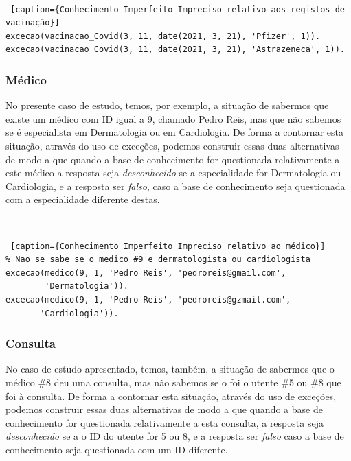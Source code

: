 \documentclass[a4paper, 11pt]{article}
\begin{document}
\

\begin{lstlisting} [caption={Conhecimento Imperfeito Impreciso relativo aos registos de 
vacinação}]
excecao(vacinacao_Covid(3, 11, date(2021, 3, 21), 'Pfizer', 1)).
excecao(vacinacao_Covid(3, 11, date(2021, 3, 21), 'Astrazeneca', 1)).
\end{lstlisting}

\subsubsection*{Médico}

No presente caso de estudo, temos, por exemplo, a situação de sabermos que existe
um médico com ID igual a 9, chamado Pedro Reis, mas que não sabemos se é especialista em
Dermatologia ou em Cardiologia. De forma a contornar esta situação, através do uso de
exceções, podemos construir essas duas alternativas de modo a que quando a base de
conhecimento for questionada relativamente a este médico a resposta seja \textit{desconhecido} se a
especialidade for Dermatologia ou Cardiologia, e a resposta ser \textit{falso}, caso a
base de conhecimento seja questionada com a especialidade diferente destas.

\

\begin{lstlisting} [caption={Conhecimento Imperfeito Impreciso relativo ao médico}]
% Nao se sabe se o medico #9 e dermatologista ou cardiologista
excecao(medico(9, 1, 'Pedro Reis', 'pedroreis@gmail.com',
        'Dermatologia')).
excecao(medico(9, 1, 'Pedro Reis', 'pedroreis@gzmail.com',
       'Cardiologia')).
\end{lstlisting}

\subsubsection*{Consulta}

No caso de estudo apresentado, temos, também, a situação de sabermos que o médico \#8 deu uma 
consulta, mas não sabemos se o foi o utente \#5 ou \#8 que foi à consulta. De forma a contornar 
esta situação, através do uso de
exceções, podemos construir essas duas alternativas de modo a que quando a base de
conhecimento for questionada relativamente a esta consulta, a resposta seja \textit{desconhecido} 
se a
o ID do utente for 5 ou 8, e a resposta ser \textit{falso} caso a
base de conhecimento seja questionada com um ID diferente.

\
\end{document}
